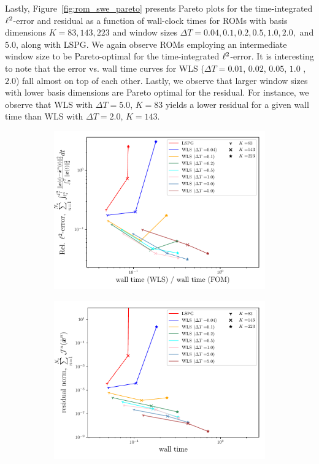 Lastly, Figure~\ref{fig:rom_swe_pareto} presents Pareto plots for the time-integrated $\ell^2$-error and residual as a function of wall-clock times for ROMs with basis dimensions $K = 83,143,223$ and window sizes $\Delta T = 0.04, 0.1,0.2,0.5,1.0,2.0,$ and $5.0$, along with LSPG. We again observe ROMs employing an intermediate window size to be Pareto-optimal for the time-integrated $\ell^2$-error. It is interesting to note that the error vs. wall time curves for WLS ($\Delta T = 0.01$, $0.02$, $0.05$, $1.0$ ,$2.0$) fall almost on top of each other. Lastly, we observe that larger window sizes with lower basis dimensions are Pareto optimal for the residual. For instance, we observe that WLS with $\Delta T = 5.0$, $K=83$ yields a lower residual for a given wall time than WLS with $\Delta T = 2.0$, $K=143$. 
\begin{figure}
\begin{center}
\begin{subfigure}[t]{0.49\textwidth}
\includegraphics[trim={0cm 0cm 0cm 0cm},clip,width=1.0\linewidth]{figs/swe/swe_converge_error_pareto.pdf}
\end{subfigure}
\begin{subfigure}[t]{0.49\textwidth}
\includegraphics[trim={0cm 0cm 0cm 0cm},clip,width=1.0\linewidth]{figs/swe/swe_converge_resid_pareto.pdf}

\end{subfigure}
\end{center}
\end{figure}
